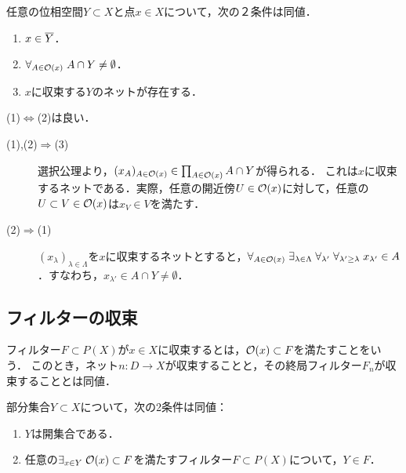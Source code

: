\documentclass[uplatex,dvipdfmx]{jsreport}
\begin{document}
\begin{proposition}[(AC)]
    任意の位相空間$Y\subset X$と点$x\in X$について，次の２条件は同値．
    \begin{enumerate}
        \item $x\in\overline{Y}$．
        \item $\forall_{A\in\mathcal{O}(x)}\;A\cap Y\ne\emptyset$．
        \item $x$に収束する$Y$のネットが存在する．
    \end{enumerate}
\end{proposition}
\begin{Proof}
    (1)$\Leftrightarrow$(2)は良い．
    \begin{description}
        \item[(1),(2)$\Rightarrow$(3)] 選択公理より，$(x_A)_{A\in\mathcal{O}(x)}\in\prod_{A\in\mathcal{O}(x)}A\cap Y$が得られる．
        これは$x$に収束するネットである．実際，任意の開近傍$U\in\mathcal{O}(x)$に対して，任意の$U\subset V\in\mathcal{O}(x)$は$x_V\in V$を満たす．
        \item[(2)$\Rightarrow$(1)] $(x_\lambda)_{\lambda\in\Lambda}$を$x$に収束するネットとすると，$\forall_{A\in\mathcal{O}(x)}\;\exists_{\lambda\in\Lambda}\;\forall_{\lambda'}\;\forall_{\lambda'\ge\lambda}\;x_{\lambda'}\in A$．すなわち，$x_{\lambda'}\in A\cap Y\ne\emptyset$．
    \end{description}
\end{Proof}

\subsection{フィルターの収束}

\begin{definition}
    フィルター$F\subset P(X)$が$x\in X$に収束するとは，$\mathcal{O}(x)\subset F$を満たすことをいう．
    このとき，ネット$n:D\to X$が収束することと，その終局フィルター$F_n$が収束することとは同値．
\end{definition}

\begin{proposition}[開集合の特徴付け]
    部分集合$Y\subset X$について，次の2条件は同値：
    \begin{enumerate}
        \item $Y$は開集合である．
        \item 任意の$\exists_{x\in Y}\;\mathcal{O}(x)\subset F$を満たすフィルター$F\subset P(X)$について，$Y\in F$．
    \end{enumerate}
\end{proposition}
\end{document}
